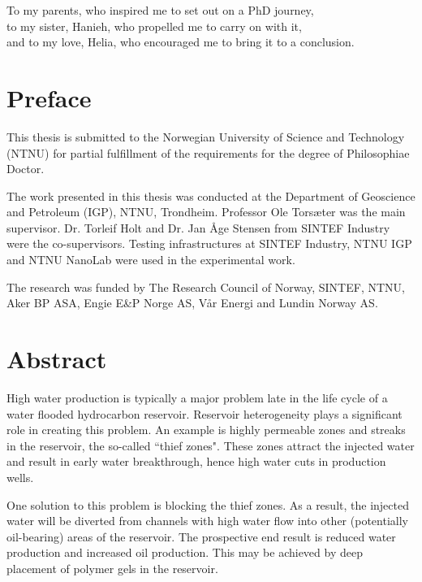 \begin{dedication}
To my parents, who inspired me to set out on a PhD journey,\\
to my sister, Hanieh, who propelled me to carry on with it,\\
and to my love, Helia, who encouraged me to bring it to a conclusion.
\end{dedication}

\clearpage{\thispagestyle{empty}\cleardoublepage}
\setcounter{page}{1}
\chapter*{Preface}

This thesis is submitted to the Norwegian University of Science and Technology (NTNU) for partial fulfillment of the requirements for the degree of Philosophiae Doctor.

The work presented in this thesis was conducted at the Department of Geoscience and Petroleum (IGP), NTNU, Trondheim. Professor Ole Torsæter was the main supervisor. Dr. Torleif Holt and Dr. Jan Åge Stensen from SINTEF Industry were the co-supervisors. Testing infrastructures at SINTEF Industry, NTNU IGP and NTNU NanoLab were used in the experimental work.  

The research was funded by The Research Council of Norway, SINTEF, NTNU, Aker BP ASA, Engie E\&P Norge AS, Vår Energi and Lundin Norway AS.


\clearpage{\thispagestyle{empty}\cleardoublepage}
\chapter*{Abstract}

High water production is typically a major problem late in the life cycle of a water flooded hydrocarbon reservoir. Reservoir heterogeneity plays a significant role in creating this problem. An example is highly permeable zones and streaks in the reservoir, the so-called ``thief zones". These zones attract the injected water and result in early water breakthrough, hence high water cuts in production wells. 

One solution to this problem is blocking the thief zones. As a result, the injected water will be diverted from channels with high water flow into other (potentially oil-bearing) areas of the reservoir. The prospective end result is reduced water production and increased oil production.  This may be achieved by deep placement of polymer gels in the reservoir. 

